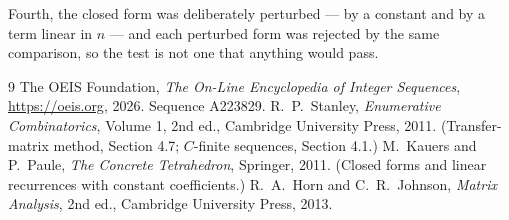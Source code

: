 \documentclass[11pt,a4paper]{article}
\theoremstyle{plain}
\theoremstyle{definition}
\begin{document}
Fourth, the closed form was deliberately perturbed --- by a constant and by a term linear in
$n$ --- and each perturbed form was rejected by the same comparison, so the test is not one
that anything would pass.

\begin{thebibliography}{9}
 The OEIS Foundation, \emph{The On-Line Encyclopedia of Integer
Sequences}, \url{https://oeis.org}, 2026. Sequence A223829.
 R.~P.~Stanley, \emph{Enumerative Combinatorics}, Volume 1, 2nd ed.,
Cambridge University Press, 2011. (Transfer-matrix method, Section 4.7; $C$-finite sequences,
Section 4.1.)
 M.~Kauers and P.~Paule, \emph{The Concrete Tetrahedron}, Springer, 2011.
(Closed forms and linear recurrences with constant coefficients.)
 R.~A.~Horn and C.~R.~Johnson, \emph{Matrix Analysis}, 2nd ed., Cambridge
University Press, 2013.
\end{thebibliography}
\end{document}
